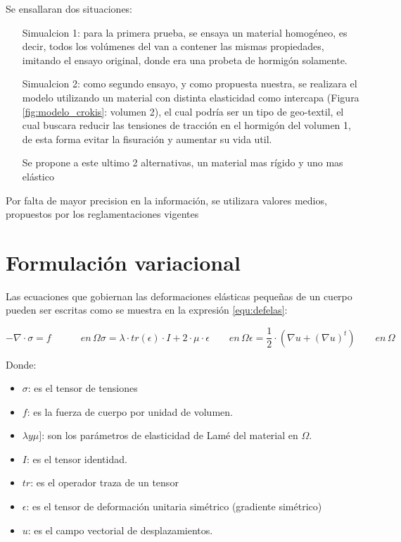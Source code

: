 \documentclass[12pt, a4paper]{article}
\begin{document}
Se ensallaran dos situaciones:

\begin{itemize}
	\item[Simualcion 1:] para la primera prueba, se ensaya un material homogéneo, es decir, todos los volúmenes del van a contener las mismas propiedades, imitando el ensayo original, donde era una probeta de hormigón solamente. 
	\item[Simualcion 2:] como segundo ensayo, y como propuesta nuestra, se realizara el modelo utilizando un material con distinta elasticidad como intercapa (Figura \ref{fig:modelo_crokis}: volumen 2), el cual podría ser un tipo de geo-textil, el cual buscara reducir las tensiones de tracción en el hormigón del volumen 1, de esta forma evitar la fisuración y aumentar su vida util.
	
	Se propone a este ultimo 2 alternativas, un material mas rígido y uno mas elástico
\end{itemize}

Por falta de mayor precision en la información, se utilizara valores medios, propuestos por los reglamentaciones vigentes

\section{Formulación variacional}
Las ecuaciones que gobiernan las deformaciones elásticas pequeñas de un cuerpo pueden ser escritas como se muestra en la expresión \ref{equ:defelas}:


\begin{subequations}
	\begin{equation}
		- \nabla \cdot \sigma  = f  \quad \quad \quad en \, \Omega
		\label{equ:defelas-a}
	\end{equation}
	\begin{equation}
		\sigma  = \lambda \cdot tr(\epsilon) \cdot I + 2 \cdot \mu \cdot \epsilon \quad \quad en \, \Omega
		\label{equ:defelas-b}
	\end{equation}
	\begin{equation}
		\epsilon  = \frac{1}{2} \cdot (\nabla u + (\nabla u)^t) \quad \quad en \, \Omega
		\label{equ:defelas-c}
	\end{equation}
	\label{equ:defelas}
\end{subequations}

Donde:
\begin{itemize}
	\item $\sigma$: es el tensor de tensiones
	\item $f$: es la fuerza de cuerpo por unidad de volumen.
	\item $\lambda y \mu]$: son los parámetros de elasticidad de Lamé del material en $\Omega$.
	\item $I$: es el tensor identidad.
	\item $tr$: es el operador traza de un tensor
	\item $\epsilon$: es el tensor de deformación unitaria simétrico (gradiente simétrico)
	\item $u$: es el campo vectorial de desplazamientos. 
\end{itemize}
\end{document}
